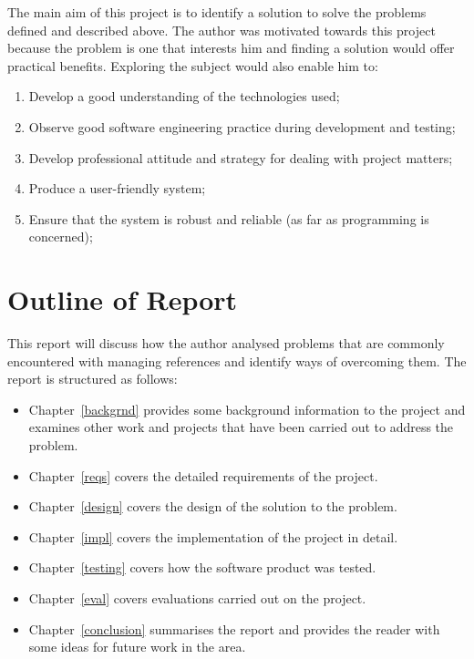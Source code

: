 The main aim of this project is to identify a solution to solve the problems defined and described above.  The author was motivated towards this project because the problem is one that interests him and finding a solution would offer practical benefits.  Exploring the subject would also enable him to:
\begin{enumerate}
	\item Develop a good understanding of the technologies used;
	\item Observe good software engineering practice during development and testing;
	\item Develop professional attitude and strategy for dealing with project matters;
	\item Produce a user-friendly system;
	\item Ensure that the system is robust and reliable (as far as programming is concerned);
\end{enumerate}


\section{Outline of Report}
This report will discuss how the author analysed problems that are commonly encountered with managing \bibtex{} references and identify ways of overcoming them.  The report is structured as follows: 
\begin{itemize}
	\item Chapter~\ref{backgrnd} provides some background information to the project and examines other work and projects that have been carried out to address the problem.
	\item Chapter~\ref{reqs} covers the detailed requirements of the project.
	\item Chapter~\ref{design} covers the design of the solution to the problem.
	\item Chapter~\ref{impl} covers the implementation of the project in detail.
	\item Chapter~\ref{testing} covers how the software product was tested.
	\item Chapter~\ref{eval} covers evaluations carried out on the project.
	\item Chapter~\ref{conclusion} summarises the report and provides the reader with some ideas for future work in the area.
\end{itemize}